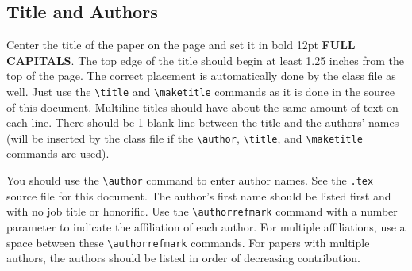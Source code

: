 \documentclass{scspaperproc}
\theoremstyle{scsthe}
\begin{document}
\subsection{Title and Authors}

Center the title of the paper on the page and set it in bold 12pt \textbf{\uppercase{full capitals}}. The top edge of the title should begin at least 1.25 inches from the top of the page. The correct placement is automatically done by the class file as well. Just use the \verb+\title+ and \verb+\maketitle+ commands as it is done in the source of this document. Multiline titles should have about the same amount of text on each line. There should be 1 blank line between the title and the authors’ names (will be inserted by the class file if the \verb+\author+, \verb+\title+, and \verb+\maketitle+ commands are used).


You should use the \verb+\author+ command to enter author names. See the \texttt{.tex} source file for this document. The author’s first name should be listed first and with no job title or honorific. Use the \verb+\authorrefmark+ command with a number parameter to indicate the affiliation of each author. For multiple affiliations, use a space between these \verb+\authorrefmark+ commands. For papers with multiple authors, the authors should be listed in order of decreasing contribution.
\end{document}
